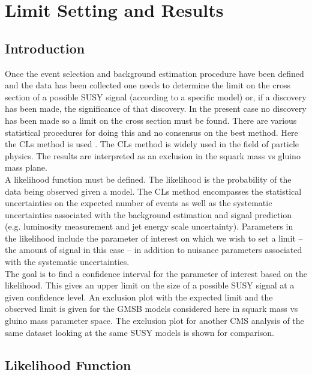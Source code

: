 \chapter{Limit Setting and Results}

\section{Introduction}

Once the event selection and background estimation procedure have been defined
and the data has been collected one needs to determine the limit on the cross
section of a possible SUSY signal (according to a specific model) or, if a 
discovery has been made, the significance of that discovery. In the present case 
no discovery has been made so a limit on the cross section must be found. There 
are various statistical procedures for doing this and no consensus on the best 
method. Here the CLs method is used \cite{cls, junk, read, higgs_combination}. 
The CLs method is widely used in the field of particle physics. The results are 
interpreted as an exclusion in the squark mass vs gluino mass plane. \\

A likelihood function must be defined. The likelihood is the probability of 
the data being observed given a model. The CLs method encompasses the 
statistical uncertainties on the expected number of events as well as the 
systematic uncertainties associated with the background estimation and signal 
prediction (e.g. luminosity measurement and jet energy scale uncertainty). 
Parameters in the likelihood include the parameter of interest on which we wish 
to set a limit -- the amount of signal in this case -- in addition to nuisance 
parameters associated with the systematic uncertainties. \\

The goal is to find a confidence interval for the parameter of interest based
on the likelihood. This gives an upper limit on the size of a possible SUSY 
signal at a given confidence level. An exclusion plot with the expected limit
and the observed limit is given for the GMSB models considered here in squark 
mass vs gluino mass parameter space. The exclusion plot for another CMS analysis
of the same dataset looking at the same SUSY models is shown for comparison.

\section{Likelihood Function}

